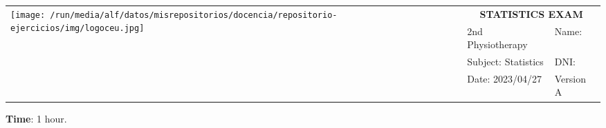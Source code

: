 \documentclass[a4paper]{article}
\begin{document}
\begin{center}
\doublespacing
\sffamily
\begin{tabular}{|p{}|p{}|p{}|}
\hline
\multirow{4}{*}{\texttt{[image: /run/media/alf/datos/misrepositorios/docencia/repositorio-ejercicios/img/logoceu.jpg]}} & \multicolumn{2}{c|}{\LARGE \textbf{STATISTICS EXAM}} \\
\cline{2-3}
& 2nd Physiotherapy & Name: \\
\cline{2-3}
& Subject: Statistics & DNI: \\
\cline{2-3}
& Date: 2023/04/27 & Version A\\
\hline
\end{tabular}
\end{center}

\noindent\textbf{Time}: 1 hour. \vskip 1cm

\begin{enumerate}[leftmargin=*]

\end{enumerate}
\end{document}
